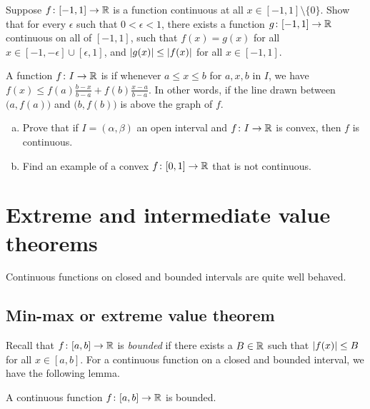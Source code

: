\begin{exercise}
Suppose $f \colon [-1,1] \to {\mathbb{R}}$ is a function continuous at all $x \in
[-1,1] \setminus \{ 0 \}$.  Show that for every $\epsilon$ such
that $0 < \epsilon < 1$, there exists
a function $g \colon [-1,1] \to {\mathbb{R}}$ continuous on all of $[-1,1]$, such that
$f(x) = g(x)$ for all $x \in [-1,-\epsilon] \cup [\epsilon,1]$, and 
$\left\lvert {g(x)} \right\rvert \leq \left\lvert {f(x)} \right\rvert$ for all $x \in [-1,1]$.
\end{exercise}

\begin{exercise}[Challenging]
A function $f \colon I \to {\mathbb{R}}$ is \emph{} if
whenever $a \leq x \leq b$ for $a,x,b$ in $I$, we have
$f(x) \leq f(a) \frac{b-x}{b-a} + f(b) \frac{x-a}{b-a}$.  In other words,
if the line drawn between $\bigl(a,f(a)\bigr)$ and $\bigl(b,f(b)\bigr)$ 
is above the graph of $f$.
\begin{enumerate}[a)]
\item
Prove that
if $I = (\alpha,\beta)$ an open interval and $f \colon I \to {\mathbb{R}}$ is convex,
then $f$ is continuous.
\item
Find an example of a convex $f \colon [0,1] \to {\mathbb{R}}$ that is
not continuous.
\end{enumerate}
\end{exercise}



\sectionnewpage
\section{Extreme and intermediate value theorems}
\label{sec:minmaxint}


Continuous functions on closed and bounded intervals
are quite well behaved.

\subsection{Min-max or extreme value theorem}

Recall that $f \colon [a,b] \to {\mathbb{R}}$ is
\emph{bounded}
if there exists a $B \in {\mathbb{R}}$ such that
$\left\lvert {f(x)} \right\rvert \leq B$ for all $x \in [a,b]$.
For a continuous function on a closed and bounded interval, we have the following lemma.

\begin{lemma}
A continuous function $f \colon [a,b] \to {\mathbb{R}}$ is bounded.
\end{lemma}

